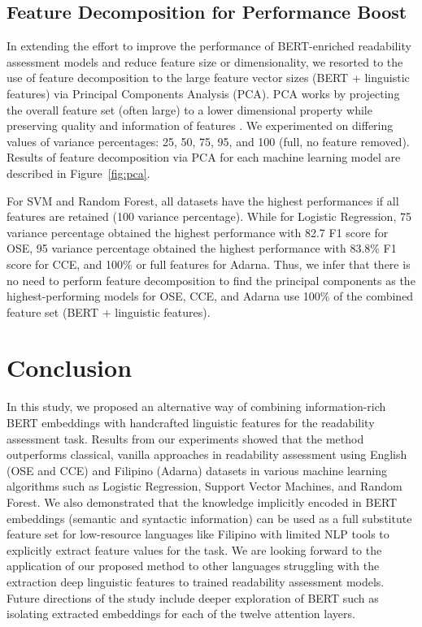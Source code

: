 \documentclass[11pt,a4paper]{article}
\begin{document}
\subsection{Feature Decomposition for Performance Boost}
In extending the effort to improve the performance of BERT-enriched readability assessment models and reduce feature size or dimensionality, we resorted to the use of feature decomposition to the large feature vector sizes (BERT + linguistic features) via Principal Components Analysis (PCA). PCA works by projecting the overall feature set (often large) to a lower dimensional property while preserving quality and information of features \cite{Hotelling1933AnalysisOA}. We experimented on differing values of variance percentages: 25, 50, 75, 95, and 100 (full, no feature removed). Results of feature decomposition via PCA for each machine learning model are described in Figure~\ref{fig:pca}. 

For SVM and Random Forest, all datasets have the highest performances if all features are retained (100 variance percentage). While for Logistic Regression, 75 variance percentage obtained the highest performance with 82.7 F1 score for OSE, 95 variance percentage obtained the highest performance with 83.8\% F1 score for CCE, and 100\% or full features for Adarna. Thus, we infer that there is no need to perform feature decomposition to find the principal components as the highest-performing models for OSE, CCE, and Adarna use 100\% of the combined feature set (BERT + linguistic features). 


\section{Conclusion}
In this study, we proposed an alternative way of combining information-rich BERT embeddings with handcrafted linguistic features for the readability assessment task. Results from our experiments showed that the method outperforms classical, vanilla approaches in readability assessment using English (OSE and CCE) and Filipino (Adarna) datasets in various machine learning algorithms such as Logistic Regression, Support Vector Machines, and Random Forest. We also demonstrated that the knowledge implicitly encoded in BERT embeddings (semantic and syntactic information) can be used as a full substitute feature set for low-resource languages like Filipino with limited NLP tools to explicitly extract feature values for the task. We are looking forward to the application of our proposed method to other languages struggling with the extraction deep linguistic features to trained readability assessment models. Future directions of the study include deeper exploration of BERT such as isolating extracted embeddings for each of the twelve attention layers. 
\end{document}
